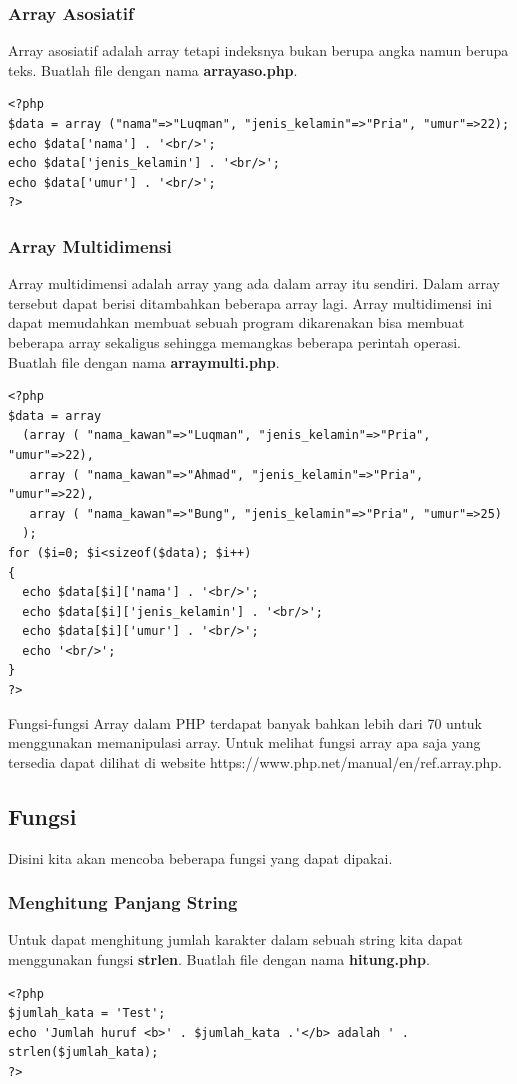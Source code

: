 \subsubsection{Array Asosiatif}
Array asosiatif adalah array tetapi indeksnya bukan berupa angka namun berupa teks. Buatlah file dengan nama \textbf{arrayaso.php}.
\begin{lstlisting}
<?php
$data = array ("nama"=>"Luqman", "jenis_kelamin"=>"Pria", "umur"=>22);
echo $data['nama'] . '<br/>';
echo $data['jenis_kelamin'] . '<br/>';
echo $data['umur'] . '<br/>';
?>
\end{lstlisting}

\subsubsection{Array Multidimensi}
Array multidimensi adalah array yang ada dalam array itu sendiri. Dalam array tersebut dapat berisi ditambahkan beberapa array lagi. Array multidimensi ini dapat memudahkan membuat sebuah program dikarenakan bisa membuat beberapa array sekaligus sehingga memangkas beberapa perintah operasi.
Buatlah file dengan nama \textbf{arraymulti.php}.
\begin{lstlisting}
<?php
$data = array
  (array ( "nama_kawan"=>"Luqman", "jenis_kelamin"=>"Pria", "umur"=>22),
   array ( "nama_kawan"=>"Ahmad", "jenis_kelamin"=>"Pria", "umur"=>22),
   array ( "nama_kawan"=>"Bung", "jenis_kelamin"=>"Pria", "umur"=>25)
  );
for ($i=0; $i<sizeof($data); $i++)
{
  echo $data[$i]['nama'] . '<br/>';
  echo $data[$i]['jenis_kelamin'] . '<br/>';
  echo $data[$i]['umur'] . '<br/>';
  echo '<br/>';
}
?>
\end{lstlisting} 
Fungsi-fungsi Array dalam PHP terdapat banyak bahkan lebih dari 70 untuk menggunakan memanipulasi array. Untuk melihat fungsi array apa saja yang tersedia dapat dilihat di website https://www.php.net/manual/en/ref.array.php.

\subsection{Fungsi}
Disini kita akan mencoba beberapa fungsi yang dapat dipakai.
\subsubsection{Menghitung Panjang String}
Untuk dapat menghitung jumlah karakter dalam sebuah string kita dapat menggunakan fungsi \textbf{strlen}. Buatlah file dengan nama \textbf{hitung.php}.
\begin{lstlisting}
<?php
$jumlah_kata = 'Test';
echo 'Jumlah huruf <b>' . $jumlah_kata .'</b> adalah ' . strlen($jumlah_kata);
?>
\end{lstlisting}

